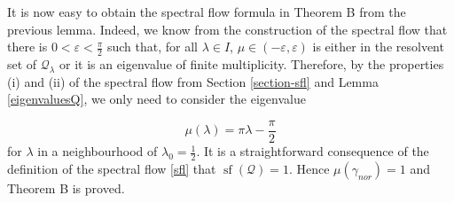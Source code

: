 \documentclass[a4paper,10pt]{article}
\DeclareMathOperator{\sfl}{sf}
\begin{document}
\noindent
It is now easy to obtain the spectral flow formula in Theorem B from the previous lemma. Indeed, we know from the construction of the spectral flow that there is $0<\varepsilon<\frac{\pi}{2}$ such that, for all $\lambda\in I$, $\mu\in(-\varepsilon,\varepsilon)$ is either in the resolvent set of $\mathcal{Q}_\lambda$ or it is an eigenvalue of finite multiplicity. Therefore, by the properties (i) and (ii) of the spectral flow from Section \ref{section-sfl} and Lemma \ref{eigenvaluesQ}, we only need to consider the eigenvalue 

\[\mu(\lambda)=\pi\lambda-\frac{\pi}{2}\]
for $\lambda$ in a neighbourhood of $\lambda_0=\frac{1}{2}$. It is a straightforward consequence of the definition of the spectral flow \eqref{sfl} that $\sfl(\mathcal{Q})=1$. Hence $\mu(\gamma_{nor})=1$ and Theorem B is proved.









\end{document}
